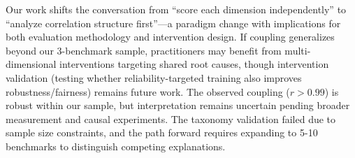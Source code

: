 Our work shifts the conversation from ``score each dimension independently'' to ``analyze correlation structure first''---a paradigm change with implications for both evaluation methodology and intervention design. If coupling generalizes beyond our 3-benchmark sample, practitioners may benefit from multi-dimensional interventions targeting shared root causes, though intervention validation (testing whether reliability-targeted training also improves robustness/fairness) remains future work. The observed coupling ($r > 0.99$) is robust within our sample, but interpretation remains uncertain pending broader measurement and causal experiments. The taxonomy validation failed due to sample size constraints, and the path forward requires expanding to 5-10 benchmarks to distinguish competing explanations.

